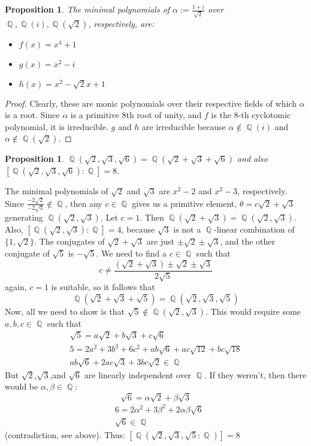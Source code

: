 \documentclass{article}
\newtheorem{proposition}[theorem]{Proposition}
\DeclareMathOperator{\Q}{\mathbb{Q}}
\begin{document}
\begin{proposition}
	The minimal polynomials of $\alpha := \frac{1+i}{\sqrt{2}}$ over $\Q,\Q(i),\Q(\sqrt{2})$, respectively, are:
	\begin{itemize}
		\item $f(x)=x^4+1$
		\item $g(x)=x^2-i$	
		\item $h(x)=x^2-\sqrt{2}x+1$
	\end{itemize}
\end{proposition}
\begin{proof}
	Clearly, these are monic polynomials over their respective fields of which $\alpha$ is a root.  Since $\alpha$ is a primitive 8th root of unity, and $f$ is the 8-th cyclotomic polynomial, it is irreducible.  $g$ and $h$ are irreducible because $\alpha\not\in\Q(i)$ and $\alpha\not\in\Q(\sqrt{2})$.
\end{proof}
\begin{proposition}
	$\Q(\sqrt{2},\sqrt{3},\sqrt{6}) = \Q(\sqrt{2}+\sqrt{3}+\sqrt{6})$ and also $[\Q(\sqrt{2},\sqrt{3},\sqrt{6}) : \Q]=8$.
\end{proposition}
The minimal polynomials of $\sqrt{2}$ and $\sqrt{3}$ are $x^2-2$ and $x^2-3$, respectively.  Since $\frac{-2\sqrt{2}}{-2\sqrt{3}}\not\in\Q$, then any $c\in\Q$ gives us a primitive element, $\theta=c\sqrt{2}+\sqrt{3}$ generating $\Q(\sqrt{2},\sqrt{3})$.  Let $c=1$. Then $\Q(\sqrt{2}+\sqrt{3}) = \Q(\sqrt{2},\sqrt{3})$.  Also, $[\Q(\sqrt{2},\sqrt{3}) : \Q] = 4$, because $\sqrt{3}$ is not a $\Q$-linear combination of $\{1,\sqrt{2}\}$.  The conjugates of $\sqrt{2}+\sqrt{3}$ are just $\pm\sqrt{2}\pm\sqrt{3}$, and the other conjugate of $\sqrt{5}$ is $-\sqrt{5}$. We need to find a $c\in\Q$ such that
\begin{equation*}
c\neq \frac{(\sqrt{2}+\sqrt{3})\pm\sqrt{2}\pm\sqrt{3}}{2\sqrt{5}}
\end{equation*}
again, $c=1$ is suitable, so it follows that\
\begin{equation*}
\Q(\sqrt{2}+\sqrt{3}+\sqrt{5}) = \Q(\sqrt{2},\sqrt{3},\sqrt{5})
\end{equation*}
Now, all we need to show is that $\sqrt{5}\not\in\Q(\sqrt{2},\sqrt{3})$.  This would require some $a,b,c\in\Q$ such that
\begin{multline*}
\sqrt{5} = a\sqrt{2}+b\sqrt{3}+c\sqrt{6}\\
5 = 2a^2+3b^3+6c^2+ab\sqrt{6}+ac\sqrt{12}+bc\sqrt{18}\\
ab\sqrt{6}+2ac\sqrt{3}+3bc\sqrt{2}\in\Q
\end{multline*}
But $\sqrt{2}$,$\sqrt{3}$,and $\sqrt{6}$ are linearly independent over $\Q$.  If they weren't, then there would be $\alpha,\beta\in\Q$:
\begin{equation*}
\sqrt{6} = \alpha\sqrt{2} + \beta\sqrt{3}
\end{equation*}
\begin{align*}
&6 = 2\alpha^2+3\beta^2+2\alpha\beta\sqrt{6}\\
&\sqrt{6}\in\Q
\end{align*}
(contradiction, see above).  Thus: $[\Q(\sqrt{2},\sqrt{3},\sqrt{5}:\Q)] = 8$
\end{document}
